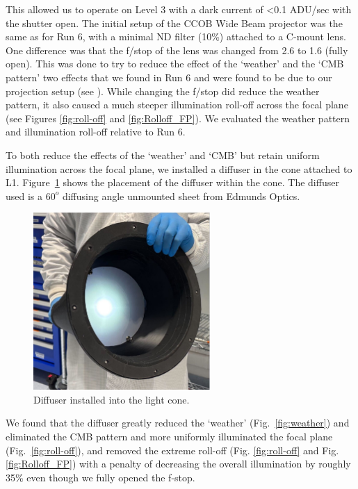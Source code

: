 This allowed us to operate on Level 3 with a dark current of \textless0.1 ADU/sec with the shutter open. The initial setup of the CCOB Wide Beam projector was the same as for Run 6, with a minimal ND filter (10\%) attached to a C-mount lens. One difference was that the f/stop of the lens was changed from 2.6 to 1.6 (fully open). This was done to try to reduce the effect of the `weather' and the `CMB pattern' two effects that we found in Run 6 and were found to be due to our projection setup (see \citet{2024arXiv241113386B}). While changing  the f/stop  did reduce the weather pattern, it also caused a much steeper illumination roll-off across the focal plane (see Figures \ref{fig:roll-off} and \ref{fig:Rolloff_FP}). We evaluated the weather pattern and illumination roll-off relative to Run 6.


To both reduce the effects of the `weather' and `CMB' but retain uniform illumination across the focal plane, we installed a diffuser in the cone attached to L1. Figure~\ref{fig:diffuser} shows the placement of the diffuser within the cone.  The diffuser used is a $60^o$ diffusing angle unmounted sheet from Edmunds Optics.

\begin{figure}[ht]
\centering
\includegraphics[width=0.6\textwidth]{figures/Diffuser.jpg}
\caption{Diffuser installed into the light cone.}
\label{fig:diffuser}
\end{figure}

We found that the diffuser greatly reduced the `weather' (Fig.~\ref{fig:weather}) and eliminated the CMB pattern and more uniformly illuminated the focal plane (Fig.~\ref{fig:roll-off}), and removed the extreme roll-off (Fig. \ref{fig:roll-off} and Fig. \ref{fig:Rolloff_FP}) with a penalty of decreasing the overall illumination by roughly 35\% even though we fully opened the f-stop.


